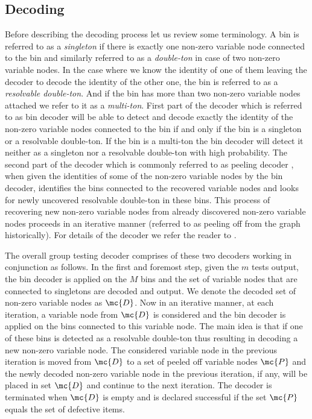 \documentclass[conference,twocolumn]{IEEEtran}
\begin{document}
\subsection*{Decoding}
Before describing the decoding process let us review some terminology. A bin is referred to as a \textit{singleton} if there is exactly one non-zero variable node connected to the bin and similarly referred to as a \textit{double-ton} in case of two non-zero variable nodes. In the case where we know the identity of one of them leaving the decoder to decode the identity of the other one, the bin is referred to as a \textit{resolvable double-ton}. And if the bin has more than two non-zero variable nodes attached we refer to it as a \textit{multi-ton}. First part of the decoder which is referred to as bin decoder will be able to detect and decode exactly the identity of the non-zero variable nodes connected to the bin if and only if the bin is a singleton or a resolvable double-ton. If the bin is a multi-ton the bin decoder will detect it neither as a singleton nor a resolvable double-ton with high probability. The second part of the decoder which is commonly referred to as peeling decoder \cite{li2015subisit}, when given the identities of some of the non-zero variable nodes by the bin decoder, identifies the bins connected to the recovered variable nodes and looks for newly uncovered resolvable double-ton in these bins. This process of recovering new non-zero variable nodes from already discovered non-zero variable nodes proceeds in an iterative manner (referred to as peeling off from the graph historically). For details of the decoder we refer the reader to \cite{lee2015saffron}.

The overall group testing decoder comprises of these two decoders working in conjunction as follows. In the first and foremost step, given the $m$ tests output, the bin decoder is applied on the $M$ bins and the set of variable nodes that are connected to singletons are decoded and output. We denote the decoded set of non-zero variable nodes as $\mc{D}$. Now in an iterative manner, at each iteration, a variable node from $\mc{D}$ is considered and the bin decoder is applied on the bins connected to this variable node.
The main idea is that if one of these bins is detected as a resolvable double-ton thus resulting in decoding a new non-zero variable node. The considered variable node in the previous iteration is moved from $\mc{D}$ to a set of peeled off variable nodes $\mc{P}$ and the newly decoded non-zero variable node in the previous iteration, if any, will be placed in set $\mc{D}$ and continue to the next iteration. The decoder is terminated when $\mc{D}$ is empty and is declared successful if the set $\mc{P}$ equals the set of defective items. 
\end{document}
